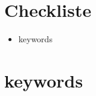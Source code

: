\documentclass[fleqn,parskip=half]{scrbook} %
\begin{document}
	
	
	\ifisbook\cleardoubleemptypage\fi
	\tableofcontents
	\cleardoublepage


	\chapter{Checkliste}
	\begin{itemize}[label=\checkmark] \itemsep -2pt
		\item keywords  
	\end{itemize}
	






	\chapter{keywords}
	


	\ifisbook\cleardoubleemptypage\fi
	\printbibliography
	
\end{document}
